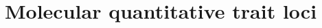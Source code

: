 
\providecommand{\R}{\mathbb{R}}
\providecommand{\E}{\mathbb{E}}
\providecommand{\Normal}{\mathcal{N}}
\providecommand{\argmax}{\operatorname*{arg\,max}}
\providecommand{\argmin}{\operatorname*{arg\,min}}
\providecommand{\vy}{\mathbf{y}}
\providecommand{\vx}{\mathbf{x}}
\providecommand{\mX}{\mathbf{X}}
\providecommand{\mI}{\mathbf{I}}
\providecommand{\vb}{\boldsymbol{\beta}}
\providecommand{\veps}{\boldsymbol{\epsilon}}
\providecommand{\vp}{\mathbf{p}}
\providecommand{\vg}{\mathbf{g}}
\providecommand{\ind}{\mathbf{1}}
\providecommand{\mY}{\mathbf{Y}}
\providecommand{\mW}{\mathbf{W}}
\providecommand{\mE}{\mathbf{E}}
\providecommand{\mS}{\mathbf{S}}
\providecommand{\mF}{\mathbf{F}}
\providecommand{\mG}{\mathbf{G}}
\providecommand{\mR}{\mathbf{R}}
\providecommand{\mU}{\mathbf{U}}
\providecommand{\mV}{\mathbf{V}}
\providecommand{\mD}{\mathbf{D}}
\providecommand{\mA}{\mathbf{A}}
\providecommand{\mSigma}{\boldsymbol{\Sigma}}
\providecommand{\vw}{\mathbf{w}}
\providecommand{\vz}{\mathbf{z}}
\providecommand{\va}{\mathbf{a}}
\providecommand{\vs}{\mathbf{s}}
\providecommand{\vf}{\mathbf{f}}
\providecommand{\vbhat}{\hat{\mathbf{b}}}
\providecommand{\vbb}{\mathbf{b}}
\providecommand{\vm}{\mathbf{m}}
\providecommand{\ve}{\mathbf{e}}
\providecommand{\vlambda}{\boldsymbol{\lambda}}
\providecommand{\vzero}{\mathbf{0}}
\providecommand{\diag}{\operatorname{diag}}
\providecommand{\Gam}{\operatorname{Gamma}}
\providecommand{\Var}{\operatorname{Var}}
\providecommand{\Cov}{\operatorname{Cov}}
\providecommand{\Bin}{\operatorname{Bin}}
\providecommand{\BetaBin}{\operatorname{BetaBin}}
\providecommand{\NB}{\operatorname{NB}}
\providecommand{\Pois}{\operatorname{Pois}}
\providecommand{\BetaDist}{\operatorname{Beta}}
\providecommand{\BetaFn}{\mathrm{B}}

\providecommand{\chaptertoc}{}
\chapter{Molecular quantitative trait loci}
\label{ch:molqtl}
\chaptertoc

